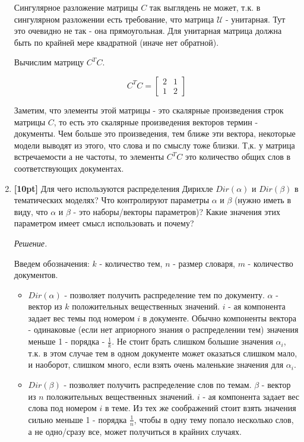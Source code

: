 \begin{enumerate}
	Сингулярное разложение матрицы $C$ так выглядень не может, т.к. в сингулярном разложении есть требование, что матрица $\mathcal{U}$ - унитарная. Тут это очевидно не так - она прямоугольная. Для унитарная матрица должна быть по крайней мере квадратной (иначе нет обратной).
	 
	 Вычислим матрицу $C^TC$. 
	 
	 \begin{equation*}
	 C^TC = 
	 \begin{bmatrix}
		 2 & 1 \\
		 1 & 2
	 \end{bmatrix}
	 \end{equation*}
	 
	 Заметим, что элементы этой матрицы - это скалярные произведения строк матрицы $C$, то есть 
	 это скалярные произведения векторов термин - документы. Чем больше это произведения, тем 
	 ближе эти вектора, некоторые модели выводят из этого, что слова и по смыслу тоже близки. Т,к. 
	 у матрица встречаемости а не частоты, то элементы $C^TC$ это количество общих слов в 
	 соответствующих документах.
	
	\item \textbf{[10pt]} Для чего используются распределения Дирихле $Dir(\alpha)$ и $Dir(\beta)$ 
	в тематических моделях? Что контролируют параметры $\alpha$ и $\beta$ (нужно иметь в виду, что 
	$\alpha$ и $\beta$ - это наборы/векторы параметров)? Какие значения этих параметром имеет 
	смысл использовать и почему?
	
	\textit{Решение.}
	
	Введем обозначения: $k$ - количество тем, $n$ - размер словаря, $m$ - количество документов.
	
	\begin{itemize}
		\item $Dir(\alpha)$ - позволяет получить распределение тем по документу. $\alpha$ - вектор 
		из $k$ положительных вещественных значений. $i$ - ая компонента задает вес темы под 
		номером $i$ в документе. Обычно компоненты вектора - одинаковые (если нет априорного 
		знания о распределении тем) значения меньше 1 - порядка - $\frac{1}{k}$. Не стоит брать 
		слишком большие значения $\alpha_i$, т.к. в этом случае тем в одном документе может 
		оказаться слишком мало, и наоборот, слишком много, если взять очень маленькие значения для 
		$\alpha_i$. 
		
		\item $Dir(\beta)$ - позволяет получить распределение слов по темам. $\beta$ - вектор из 
		$n$ положительных вещественных значений. $i$ - ая компонента задает вес слова под номером 
		$i$ в теме. Из тех же соображений стоит взять значения сильно меньше 1 - порядка 
		$\frac{1}{n}$, чтобы в одну тему попало несколько слов, а не одно/сразу все, может 
		получиться в крайних случаях.
	\end{itemize}
	

\end{enumerate}
